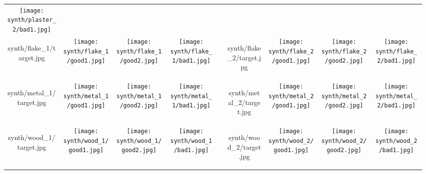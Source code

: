 \begin{figure*}[t]
\begin{tabular}{ccccccccc}
		\texttt{[image: synth/plaster\_2/bad1.jpg]}
		\\
		\begin{overpic}[width=\resultwidth]{synth/flake_1/target.jpg}
			\imglabel{Metallicflake-1}
		\end{overpic} &
		\texttt{[image: synth/flake\_1/good1.jpg]} &
		\texttt{[image: synth/flake\_1/good2.jpg]} &
		\texttt{[image: synth/flake\_1/bad1.jpg]} &
		&
		\begin{overpic}[width=\resultwidth]{synth/flake_2/target.jpg}
			\imglabel{Metallicflake-2}
		\end{overpic} &
		\texttt{[image: synth/flake\_2/good1.jpg]} &
		\texttt{[image: synth/flake\_2/good2.jpg]} &
		\texttt{[image: synth/flake\_2/bad1.jpg]}
		\\
		\begin{overpic}[width=\resultwidth]{synth/metal_1/target.jpg}
			\imglabel{Brushmetal-1}
		\end{overpic} &
		\texttt{[image: synth/metal\_1/good1.jpg]} &
		\texttt{[image: synth/metal\_1/good2.jpg]} &
		\texttt{[image: synth/metal\_1/bad1.jpg]} &
		&
		\begin{overpic}[width=\resultwidth]{synth/metal_2/target.jpg}
			\imglabel{Brushmetal-2}
		\end{overpic} &
		\texttt{[image: synth/metal\_2/good1.jpg]} &
		\texttt{[image: synth/metal\_2/good2.jpg]} &
		\texttt{[image: synth/metal\_2/bad1.jpg]}
		\\
		\begin{overpic}[width=\resultwidth]{synth/wood_1/target.jpg}
			\imglabel{Wood-1}
		\end{overpic} &
		\texttt{[image: synth/wood\_1/good1.jpg]} &
		\texttt{[image: synth/wood\_1/good2.jpg]} &
		\texttt{[image: synth/wood\_1/bad1.jpg]} & &
		\begin{overpic}[width=\resultwidth]{synth/wood_2/target.jpg}
			\imglabel{Wood-2}
		\end{overpic} &
		\texttt{[image: synth/wood\_2/good1.jpg]} &
		\texttt{[image: synth/wood\_2/good2.jpg]} &
		\texttt{[image: synth/wood\_2/bad1.jpg]}
	\end{tabular}
	\captionsetup{labelfont=bf,textfont=it}
	\caption{\label{fig:synth}
		\textbf{Results} of our MCMC sampling on \textbf{synthetic} inputs. Each row corresponds to two examples of a different material model. For each example, the first column is the synthetic target image. We show MCMC samples in the other columns, where sample-1 and sample-2 are chosen closer to the peak of the posterior distribution, and sample-3 is further away. More results please refer to supplemental materials.
	}
\end{figure*}

